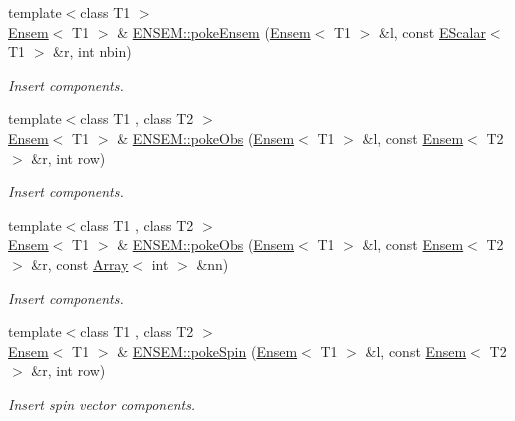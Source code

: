 \begin{DoxyCompactItemize}
\item 
{\footnotesize template$<$class T1 $>$ }\\\mbox{\hyperlink{classENSEM_1_1Ensem}{Ensem}}$<$ T1 $>$ \& \mbox{\hyperlink{group__eensem_gac250f0269fc0f62be437e1f400b3b7b9}{E\+N\+S\+E\+M\+::poke\+Ensem}} (\mbox{\hyperlink{classENSEM_1_1Ensem}{Ensem}}$<$ T1 $>$ \&l, const \mbox{\hyperlink{classENSEM_1_1EScalar}{E\+Scalar}}$<$ T1 $>$ \&r, int nbin)
\begin{DoxyCompactList}\small\item\em Insert components. \end{DoxyCompactList}\item 
{\footnotesize template$<$class T1 , class T2 $>$ }\\\mbox{\hyperlink{classENSEM_1_1Ensem}{Ensem}}$<$ T1 $>$ \& \mbox{\hyperlink{group__eensem_ga44fada3144f6b1bb4d161722a389abd9}{E\+N\+S\+E\+M\+::poke\+Obs}} (\mbox{\hyperlink{classENSEM_1_1Ensem}{Ensem}}$<$ T1 $>$ \&l, const \mbox{\hyperlink{classENSEM_1_1Ensem}{Ensem}}$<$ T2 $>$ \&r, int row)
\begin{DoxyCompactList}\small\item\em Insert components. \end{DoxyCompactList}\item 
{\footnotesize template$<$class T1 , class T2 $>$ }\\\mbox{\hyperlink{classENSEM_1_1Ensem}{Ensem}}$<$ T1 $>$ \& \mbox{\hyperlink{group__eensem_gaf4969f408bf59ed0fb219c61def36156}{E\+N\+S\+E\+M\+::poke\+Obs}} (\mbox{\hyperlink{classENSEM_1_1Ensem}{Ensem}}$<$ T1 $>$ \&l, const \mbox{\hyperlink{classENSEM_1_1Ensem}{Ensem}}$<$ T2 $>$ \&r, const \mbox{\hyperlink{classXMLArray_1_1Array}{Array}}$<$ int $>$ \&nn)
\begin{DoxyCompactList}\small\item\em Insert components. \end{DoxyCompactList}\item 
{\footnotesize template$<$class T1 , class T2 $>$ }\\\mbox{\hyperlink{classENSEM_1_1Ensem}{Ensem}}$<$ T1 $>$ \& \mbox{\hyperlink{group__eensem_ga20ff818f34faa2f1d5067da3ff139ba9}{E\+N\+S\+E\+M\+::poke\+Spin}} (\mbox{\hyperlink{classENSEM_1_1Ensem}{Ensem}}$<$ T1 $>$ \&l, const \mbox{\hyperlink{classENSEM_1_1Ensem}{Ensem}}$<$ T2 $>$ \&r, int row)
\begin{DoxyCompactList}\small\item\em Insert spin vector components. \end{DoxyCompactList}\item 

\end{DoxyCompactItemize}
